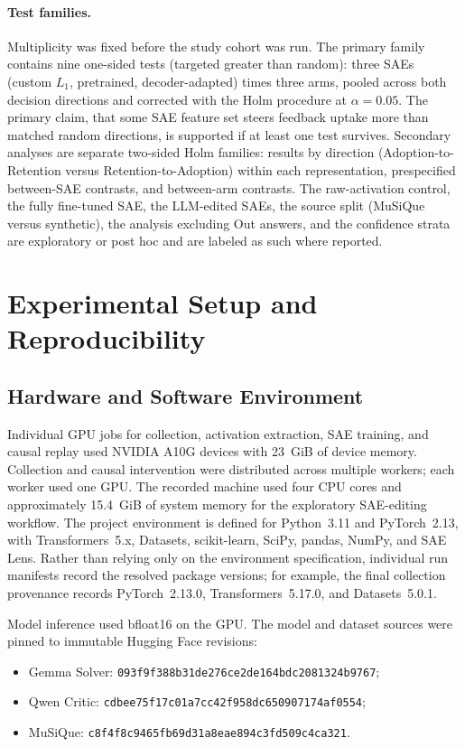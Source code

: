 \paragraph{Test families.} Multiplicity was fixed before the study cohort was
run. The primary family contains nine one-sided tests (targeted greater than
random): three SAEs (custom $L_1$, pretrained, decoder-adapted) times three
arms, pooled across both decision directions and corrected with the Holm
procedure \cite{holm1979simple} at $\alpha=0.05$. The primary claim, that some
SAE feature set steers feedback uptake more than matched random directions, is
supported if at least one test survives. Secondary analyses are separate
two-sided Holm families: results by direction (Adoption-to-Retention versus
Retention-to-Adoption) within each representation, prespecified between-SAE
contrasts, and between-arm contrasts. The raw-activation control, the fully
fine-tuned SAE, the LLM-edited SAEs, the source split (MuSiQue versus
synthetic), the analysis excluding Out answers, and the confidence strata are
exploratory or post hoc and are labeled as such where reported.
\section{Experimental Setup and Reproducibility}

\subsection{Hardware and Software Environment}

Individual GPU jobs for collection, activation extraction, SAE training, and
causal replay used NVIDIA A10G devices with 23~GiB of device memory. Collection
and causal intervention were distributed across multiple workers; each worker
used one GPU. The
recorded machine used four CPU cores and approximately 15.4~GiB of system
memory for the exploratory SAE-editing workflow. The project environment is
defined for Python~3.11 and PyTorch~2.13, with Transformers~5.x, Datasets,
scikit-learn, SciPy, pandas, NumPy, and SAE Lens. Rather than relying only on
the environment specification, individual run manifests record the resolved
package versions; for example, the final collection provenance records
PyTorch~2.13.0, Transformers~5.17.0, and Datasets~5.0.1.

Model inference used bfloat16 on the GPU. The model and dataset sources were
pinned to immutable Hugging Face revisions:

\begin{itemize}
    \item Gemma Solver: \texttt{093f9f388b31de276ce2de164bdc2081324b9767};
    \item Qwen Critic: \texttt{cdbee75f17c01a7cc42f958dc650907174af0554};
    \item MuSiQue: \texttt{c8f4f8c9465fb69d31a8eae894c3fd509c4ca321}.
\end{itemize}

